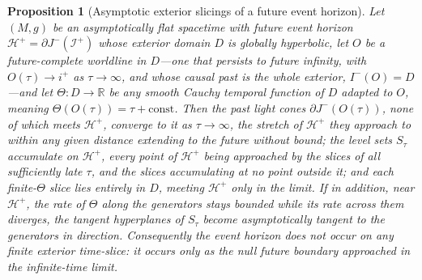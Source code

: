 \documentclass[11pt,a4paper]{article}
\theoremstyle{plain}
\newtheorem{proposition}{Proposition}
\theoremstyle{remark}
\begin{document}
\begin{proposition}[Asymptotic exterior slicings of a future event horizon]\label{prop:causal-alignment}
Let $(M,g)$ be an asymptotically flat spacetime with future event horizon $\mathcal{H}^+=\partial J^-(\mathscr{I}^+)$ whose exterior domain $D$ is globally hyperbolic, let $O$ be a future-complete worldline in $D$---one that persists to future infinity, with $O(\tau)\to i^+$ as $\tau\to\infty$, and whose causal past is the whole exterior, $I^-(O)=D$---and let $\Theta:D\to\mathbb{R}$ be any smooth Cauchy temporal function of $D$ adapted to $O$, meaning $\Theta(O(\tau))=\tau+\mathrm{const}$. Then the past light cones $\partial J^-(O(\tau))$, none of which meets $\mathcal{H}^+$, converge to it as $\tau\to\infty$, the stretch of $\mathcal{H}^+$ they approach to within any given distance extending to the future without bound; the level sets $S_\tau$ accumulate on $\mathcal{H}^+$, every point of $\mathcal{H}^+$ being approached by the slices of all sufficiently late $\tau$, and the slices accumulating at no point outside it; and each finite-$\Theta$ slice lies entirely in $D$, meeting $\mathcal{H}^+$ only in the limit. If in addition, near $\mathcal{H}^+$, the rate of $\Theta$ along the generators stays bounded while its rate across them diverges, the tangent hyperplanes of $S_\tau$ become asymptotically tangent to the generators in direction. Consequently the event horizon does not occur on any finite exterior time-slice: it occurs only as the null future boundary approached in the infinite-time limit.
\end{proposition}
\end{document}
